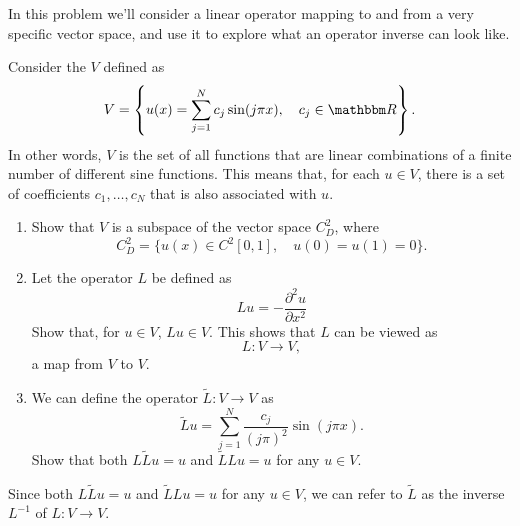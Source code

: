 In this problem we'll consider a linear operator mapping to and from a very specific vector space, and use it to explore what an operator inverse can look like.  

Consider the $V$ defined as
\[
V = \left\{ u(x) = \sum_{j = 1}^N c_j \sin( j \pi x), \quad c_j \in \R \right\}.
\]
In other words, $V$ is the set of all functions that are linear combinations of a finite number of different sine functions.  This means that, for each $u\in V$, there is a set of coefficients $c_1,\ldots, c_N$ that is also associated with $u$.  

\begin{enumerate}
\item Show that $V$ is a subspace of the vector space $C^2_D$, where 
\[
C^2_D = \{ u(x)\in C^2[0,1], \quad u(0) = u(1) = 0\}.
\]
\item Let the operator $L$ be defined as
\[
Lu = -\frac{\partial^2 u}{ \partial x^2}
\]
Show that, for $u\in V$, $Lu\in V$.  This shows that $L$ can be viewed as 
\[
L: V\rightarrow V,
\]
a map from $V$ to $V$.
\item We can define the operator $\tilde{L}: V\rightarrow V$ as
\[
\tilde{L} u =  \sum_{j = 1}^N \frac{c_j}{(j\pi)^2} \sin( j \pi x).
\]
Show that both $L\tilde{L}u = u$ and $\tilde{L}Lu = u$ for any $u\in V$.  
\end{enumerate}
Since both $L\tilde{L}u = u$ and $\tilde{L}Lu = u$ for any $u\in V$, we can refer to $\tilde{L}$ as the inverse $L^{-1}$ of $L:V\rightarrow V$.  



